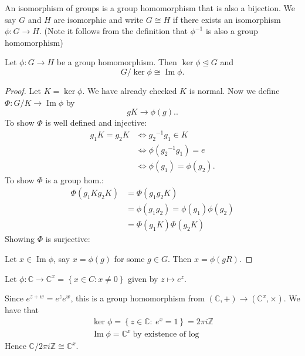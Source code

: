 \documentclass[egregdoesnotlikesansseriftitles,a4paper]{scrartcl}
\begin{document}
\begin{definition*}[Isomorphism]
      An isomorphism of groups is a group homomorphism that is also a bijection. We say $G$ and $H$ are isomorphic and write $G \cong H$ if there exists an isomorphism $\phi: G \rightarrow H$. (Note it follows from the definition that ${\phi}^{-1}$ is also a group homomorphism)
\end{definition*}

\begin{theorem}
      Let $\phi: G \rightarrow H$ be a group homomorphism. Then $\operatorname{ker}\phi \unlhd G$ and \[
      G/\operatorname{ker}\phi \cong \operatorname{Im} \phi
      .\] 
\end{theorem}
\begin{proof}
      Let $K=\operatorname{ker} \phi$. We have already checked $K$ is normal. Now we define $\Phi: G/K \rightarrow \operatorname{Im} \phi$ by \[
      gK \rightarrow \phi (g).
      .\]
      To show $\Phi$ is well defined and injective: 
      \begin{align*}
           g_1 K= g_2 K &\iff {g_2 }^{-1}g_1 \in K\\
           &\iff \phi ({g_2 }^{-1}g_1 )=e\\
           &\iff \phi (g_1 )=\phi (g_2 ). 
      \end{align*}
      To show $\Phi$ is a group hom.: 
      \begin{align*}
           \Phi (g_1 K g_2 K)&=\Phi (g_1 g_2 K)\\
           &=\phi (g_1 g_2 )=\phi (g_1 ) \phi (g_2 )\\
           &=\Phi (g_1 K) \Phi (g_2 K)
      \end{align*}
      Showing $\Phi$ is surjective:

      Let $x \in \operatorname{Im} \phi$, say $x= \phi (g)$ for some $g \in G$. Then $x=\phi (gR)$.
\end{proof}
\begin{example*}
      Let $\phi: \mathbb{C} \rightarrow \mathbb{C}^x= \left\{x \in C: x \neq 0\right\}$ given by $z \mapsto e^{z}$.

      Since $e^{z+w}=e^{z}e^{w}$, this is a group homomorphism from $(\mathbb{C},+) \rightarrow (\mathbb{C}^{x},\times)$. We have that 
      \begin{align*}
          \operatorname{ker} \phi= \left\{z \in \mathbb{C}: \ e^x=1\right\}=2 \pi i \mathbb{Z}\\
          \operatorname{Im} \phi=\mathbb{C}^{x} \ \text{by existence of log}
      \end{align*}
      Hence $\mathbb{C}/2 \pi i \mathbb{Z} \cong \mathbb{C}^{x}$. 
\end{example*}
\end{document}
